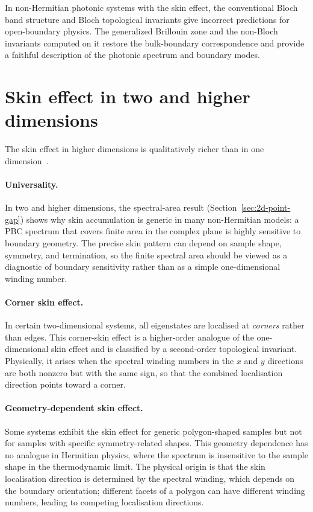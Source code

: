 \begin{takeaway}
In non-Hermitian photonic systems with the skin effect, the conventional
Bloch band structure and Bloch topological invariants give incorrect
predictions for open-boundary physics. The generalized Brillouin zone
and the non-Bloch invariants computed on it restore the bulk-boundary
correspondence and provide a faithful description of the photonic
spectrum and boundary modes.
\end{takeaway}


\section{Skin effect in two and higher dimensions}
\label{sec:skin-2d}

The skin effect in higher dimensions is qualitatively richer than in
one dimension~\cite{zhang2022universal}.

\paragraph{Universality.}
In two and higher dimensions, the spectral-area result
(Section~\ref{sec:2d-point-gap}) shows why skin accumulation is generic
in many non-Hermitian models: a PBC spectrum that covers finite area in
the complex plane is highly sensitive to boundary geometry. The precise
skin pattern can depend on sample shape, symmetry, and termination, so
the finite spectral area should be viewed as a diagnostic of boundary
sensitivity rather than as a simple one-dimensional winding number.

\paragraph{Corner skin effect.}
In certain two-dimensional systems, all eigenstates are localised at
\emph{corners} rather than edges. This corner-skin effect is a
higher-order analogue of the one-dimensional skin effect and is
classified by a second-order topological invariant. Physically, it
arises when the spectral winding numbers in the $x$ and $y$ directions
are both nonzero but with the same sign, so that the combined
localisation direction points toward a corner.

\paragraph{Geometry-dependent skin effect.}
Some systems exhibit the skin effect for generic polygon-shaped samples
but not for samples with specific symmetry-related shapes. This
geometry dependence has no analogue in Hermitian physics, where the
spectrum is insensitive to the sample shape in the thermodynamic limit.
The physical origin is that the skin localisation direction is determined
by the spectral winding, which depends on the boundary orientation;
different facets of a polygon can have different winding numbers, leading
to competing localisation directions.

